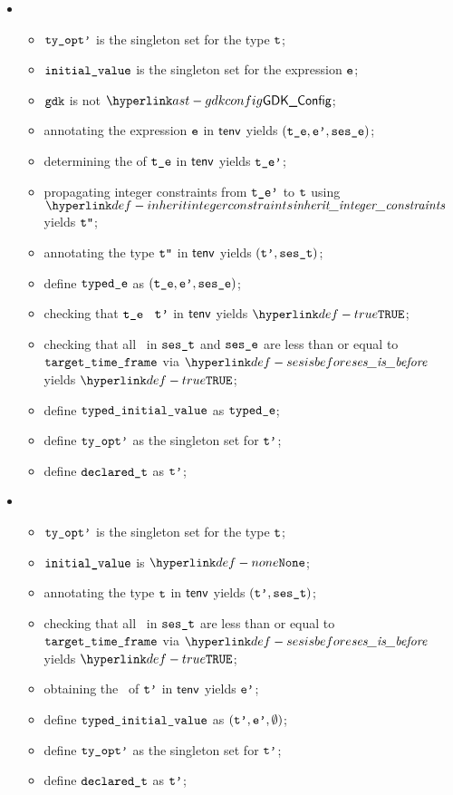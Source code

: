\begin{itemize}
  \item {}
  \begin{itemize}
    \item $\texttt{ty\_opt'}$ is the singleton set for the type $\texttt{t}$;
    \item $\texttt{initial\_value}$ is the singleton set for the expression $\texttt{e}$;
    \item $\texttt{gdk}$ is not $\GDKConfig$;
    \item annotating the expression $\texttt{e}$ in $\textsf{tenv}$ yields $(\texttt{t\_e}, \texttt{e'}, \texttt{ses\_e})$\ProseOrTypeError;
    \item determining the \structure{} of $\texttt{t\_e}$ in $\textsf{tenv}$ yields $\texttt{t\_e'}$\ProseOrTypeError;
    \item propagating integer constraints from $\texttt{t\_e'}$ to $\texttt{t}$ using $\inheritintegerconstraints$ yields $\texttt{t''}$\ProseOrTypeError;
    \item annotating the type $\texttt{t''}$ in $\textsf{tenv}$ yields $(\texttt{t'}, \texttt{ses\_t})$\ProseOrTypeError;
    \item define $\texttt{typed\_e}$ as $(\texttt{t\_e}, \texttt{e'}, \texttt{ses\_e})$;
    \item checking that $\texttt{t\_e}$ \typesatisfies\ $\texttt{t'}$ in $\textsf{tenv}$ yields $\True$\ProseOrTypeError;
    \item checking that all \timeframesterm\ in $\texttt{ses\_t}$ and $\texttt{ses\_e}$ are less than or equal to \\
          $\texttt{target\_time\_frame}$ via $\sesisbefore$ yields $\True$\ProseOrTypeError;
    \item define $\texttt{typed\_initial\_value}$ as $\texttt{typed\_e}$;
    \item define $\texttt{ty\_opt'}$ as the singleton set for $\texttt{t'}$;
    \item define $\texttt{declared\_t}$ as $\texttt{t'}$;
  \end{itemize}

  \item {}
  \begin{itemize}
    \item $\texttt{ty\_opt'}$ is the singleton set for the type $\texttt{t}$;
    \item $\texttt{initial\_value}$ is $\None$;
    \item annotating the type $\texttt{t}$ in $\textsf{tenv}$ yields $(\texttt{t'}, \texttt{ses\_t})$\ProseOrTypeError;
    \item checking that all \timeframesterm\ in $\texttt{ses\_t}$ are less than or equal to \\
          $\texttt{target\_time\_frame}$ via $\sesisbefore$ yields $\True$\ProseOrTypeError;
    \item obtaining the \basevalueterm\ of $\texttt{t'}$ in $\textsf{tenv}$ yields $\texttt{e'}$\ProseOrTypeError;
    \item define $\texttt{typed\_initial\_value}$ as $(\texttt{t'}, \texttt{e'}, \emptyset)$;
    \item define $\texttt{ty\_opt'}$ as the singleton set for $\texttt{t'}$;
    \item define $\texttt{declared\_t}$ as $\texttt{t'}$;
  \end{itemize}


\end{itemize}
